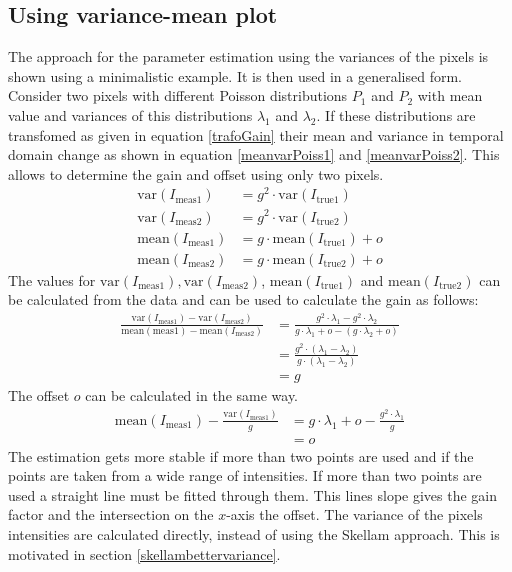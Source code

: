 \subsection{Using variance-mean plot} \label{skellam1}
The approach for the parameter estimation using the variances of the pixels is shown using a minimalistic example. It is then used in a generalised form.\newline
Consider two pixels with different Poisson distributions $P_1$ and $P_2$ with mean value and variances of this distributions $\lambda_1$ and $\lambda_2$. If these distributions are transfomed as given in equation \ref{trafoGain} their mean and variance in temporal domain change as shown in equation \ref{meanvarPoiss1} and \ref{meanvarPoiss2}. This allows to determine the gain and offset using only two pixels.
\begin{align}
	\text{var}(I_{\text{meas}1})& = g^2\cdot\text{var}(I_{\text{true}1}) \label{calcvar}\\ 
	\text{var}(I_{\text{meas}2})& = g^2\cdot\text{var}(I_{\text{true}2})\\
	\text{mean}(I_{\text{meas}1})& = g\cdot \text{mean}(I_{\text{true}1}) + o\\
	\text{mean}(I_{\text{meas}2})& = g\cdot \text{mean}(I_{\text{true}2}) + o
\end{align}
The values for $\text{var}(I_{\text{meas}1}), \text{var}(I_{\text{meas}2})$, $\text{mean}(I_{\text{true}1})$ and $\text{mean}(I_{\text{true}2})$ can be calculated from the data and can be used to calculate the gain as follows:
\begin{align}
	\frac{\text{var}(I_{\text{meas}1})-\text{var}(I_{\text{meas}2})}{\text{mean}({\text{meas}1})-\text{mean}(I_{\text{meas}2})}&= \frac{g^2\cdot \lambda_1  - g^2\cdot \lambda_2 }{g\cdot \lambda_1 + o - (g\cdot \lambda_2+o)}\\
	& = \frac{g^2\cdot(\lambda_1-\lambda_2)}{g\cdot (\lambda_1-\lambda_2)}\\
	& = g
\end{align}
The offset $o$ can be calculated in the same way.
\begin{align}
	\text{mean}(I_{\text{meas}1}) - \frac{\text{var}(I_{\text{meas}1})}{g} &= g\cdot \lambda_1 + o - \frac{g^2\cdot\lambda_1}{g}\\
	&= o
\end{align}
The estimation gets more stable if more than two points are used and if the points are taken from a wide range of intensities. If more than two points are used a straight line must be fitted through them. This lines slope gives the gain factor and the intersection on the $x$-axis the offset. The variance of the pixels intensities are calculated directly, instead of using the Skellam approach. This is motivated in section \ref{skellambettervariance}.
